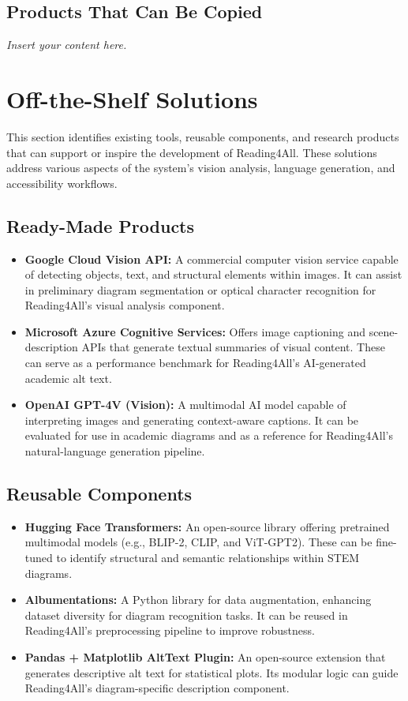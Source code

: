 \documentclass[12pt]{article}
\newcommand{\lips}{\textit{Insert your content here.}}
\begin{document}
\subsection{Products That Can Be Copied}
\lips
\section{Off-the-Shelf Solutions}

This section identifies existing tools, reusable components, and research products that can support or inspire the development of Reading4All. These solutions address various aspects of the system’s vision analysis, language generation, and accessibility workflows.

\subsection{Ready-Made Products}

\begin{itemize}
    \item \textbf{Google Cloud Vision API:} A commercial computer vision service capable of detecting objects, text, and structural elements within images. It can assist in preliminary diagram segmentation or optical character recognition for Reading4All’s visual analysis component.

    \item \textbf{Microsoft Azure Cognitive Services:} Offers image captioning and scene-description APIs that generate textual summaries of visual content. These can serve as a performance benchmark for Reading4All’s AI-generated academic alt text.

    \item \textbf{OpenAI GPT-4V (Vision):} A multimodal AI model capable of interpreting images and generating context-aware captions. It can be evaluated for use in academic diagrams and as a reference for Reading4All’s natural-language generation pipeline.
\end{itemize}

\subsection{Reusable Components}

\begin{itemize}
    \item \textbf{Hugging Face Transformers:} An open-source library offering pretrained multimodal models (e.g., BLIP-2, CLIP, and ViT-GPT2). These can be fine-tuned to identify structural and semantic relationships within STEM diagrams.

    \item \textbf{Albumentations:} A Python library for data augmentation, enhancing dataset diversity for diagram recognition tasks. It can be reused in Reading4All’s preprocessing pipeline to improve robustness.

    \item \textbf{Pandas + Matplotlib AltText Plugin:} An open-source extension that generates descriptive alt text for statistical plots. Its modular logic can guide Reading4All’s diagram-specific description component.
\end{itemize}
\end{document}

